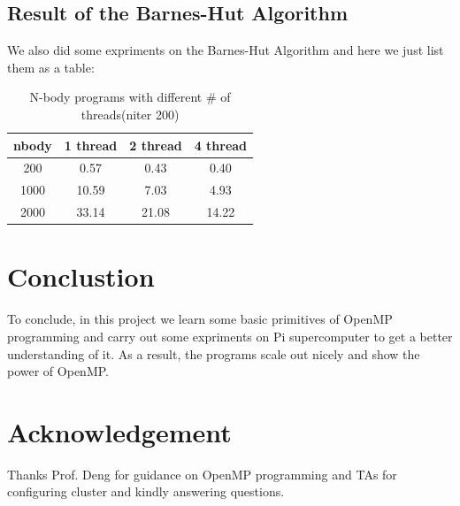\documentclass{article}
\begin{document}
\subsection{Result of the Barnes-Hut Algorithm}
We also did some expriments on the Barnes-Hut Algorithm and here we just list them as a table:
\begin{table}[H]
\centering
	\begin{tabular}{c|c|c|c}
	nbody	& 1 thread & 2 thread & 4 thread \\ \hline
	200		& 0.57 & 0.43 & 0.40  \\ \hline
	1000	& 10.59 & 7.03 & 4.93  \\ \hline
	2000    & 33.14 & 21.08 & 14.22 
	\end{tabular}
	\caption{N-body programs with different \# of threads(niter 200)}
\end{table}





\section{Conclustion}
To conclude, in this project we learn some basic primitives of OpenMP programming and carry out some expriments on Pi supercomputer to get a better understanding of it. As a result, the programs scale out nicely and show the power of OpenMP.

\section*{Acknowledgement}
Thanks Prof. Deng for guidance on OpenMP programming and TAs for configuring cluster and kindly answering questions.
\end{document}
